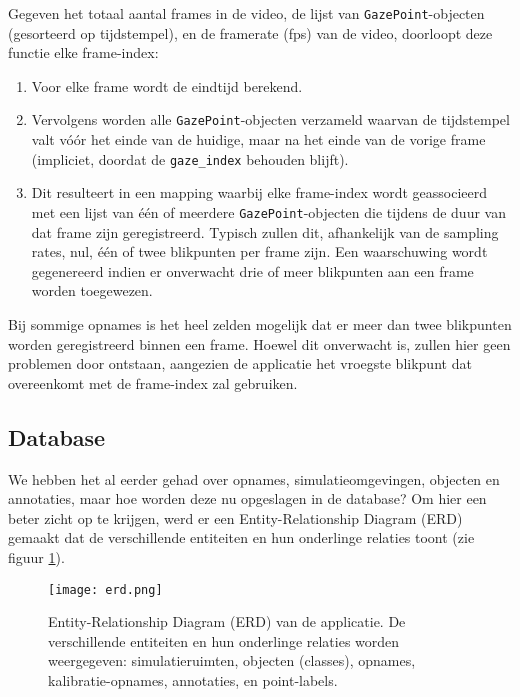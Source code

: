Gegeven het totaal aantal frames in de video, de lijst van \texttt{GazePoint}-objecten (gesorteerd op tijdstempel), 
en de framerate (fps) van de video, doorloopt deze functie elke frame-index:
\begin{enumerate}
  \item Voor elke frame wordt de eindtijd berekend.
  \item Vervolgens worden alle \texttt{GazePoint}-objecten verzameld waarvan de tijdstempel valt vóór het einde van de huidige, 
  maar na het einde van de vorige frame (impliciet, doordat de \texttt{gaze\_index} behouden blijft).
  \item Dit resulteert in een mapping waarbij elke frame-index wordt geassocieerd met een lijst van één of meerdere 
  \texttt{GazePoint}-objecten die tijdens de duur van dat frame zijn geregistreerd. 
  Typisch zullen dit, afhankelijk van de sampling rates, nul, één of twee blikpunten per frame zijn. 
  Een waarschuwing wordt gegenereerd indien er onverwacht drie of meer blikpunten aan een frame worden toegewezen.
\end{enumerate}

Bij sommige opnames is het heel zelden mogelijk dat er meer dan twee blikpunten worden geregistreerd binnen een frame.
Hoewel dit onverwacht is, zullen hier geen problemen door ontstaan, aangezien de 
applicatie het vroegste blikpunt dat overeenkomt met de frame-index zal gebruiken.

\subsection{Database}

We hebben het al eerder gehad over opnames, simulatieomgevingen, objecten en annotaties, maar hoe worden deze nu opgeslagen in de database?
Om hier een beter zicht op te krijgen, werd er een Entity-Relationship Diagram (ERD) gemaakt dat de verschillende entiteiten en hun onderlinge relaties toont (zie figuur \ref{fig:erd}).

\begin{figure}[H]
  \centering
  \texttt{[image: erd.png]}
  \caption[]{\label{fig:erd} Entity-Relationship Diagram (ERD) van de applicatie. De verschillende entiteiten en hun onderlinge relaties worden weergegeven: simulatieruimten, objecten (classes), opnames, kalibratie-opnames, annotaties, en point-labels. }
\end{figure}

